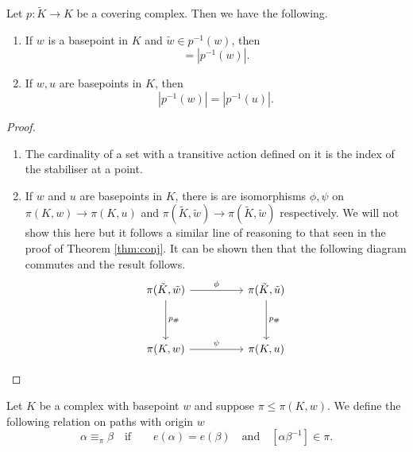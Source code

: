 \begin{corollary}
  Let $p: \tilde{K} \rightarrow K$ be a covering complex. Then we have the following.
  \begin{enumerate}
  \item If $w$ is a basepoint in $K$ and $\tilde{w} \in p^{-1}(w)$, then
    \begin{equation*}
      [\pi(K,w) : p_{\#}\pi(\tilde{K},\tilde{w})] = |p^{-1}(w)|.
    \end{equation*}
  \item If $w,u$ are basepoints in $K$, then
    \begin{equation*}
      |p^{-1}(w)| = |p^{-1}(u)|.
    \end{equation*}
  \end{enumerate}
\end{corollary}

\begin{proof}
  \begin{enumerate}
  \item The cardinality of a set with a transitive action defined on it is the index of the stabiliser at a point.
  \item If $w$ and $u$ are basepoints in $K$, there is are isomorphisms $\phi,\psi$ on $\pi(K,w)\rightarrow\pi(K,u)$ and $\pi(\tilde{K},\tilde{w})\rightarrow\pi(\tilde{K},\tilde{w})$ respectively. We will not show this here but it follows a similar line of reasoning to that seen in the proof of Theorem \ref{thm:conj}. It can be shown then that the following diagram commutes and the result follows.
    \begin{equation*}
      \begin{tikzcd}[ampersand replacement=\&, sep=huge]
        \pi(\tilde{K},\tilde{w})\arrow[r,"\phi"]\arrow[d,"p_{\#}"]\& \pi(\tilde{K},\tilde{u}) \arrow[d,"p_{\#}"] \\
        \pi(K,w) \arrow[r,"\psi"] \& \pi(K,u)
      \end{tikzcd}
    \end{equation*}
  \end{enumerate}
\end{proof}

\begin{definition}
  Let $K$ be a complex with basepoint $w$ and suppose $\pi \leq \pi(K,w)$. We define the following relation on paths with origin $w$
  \begin{equation*}
    \alpha \equiv_\pi \beta \quad\text{if}\qquad e(\alpha) = e(\beta) \quad\text{and}\quad [\alpha\beta^{-1}] \in \pi.
  \end{equation*}
\end{definition}

